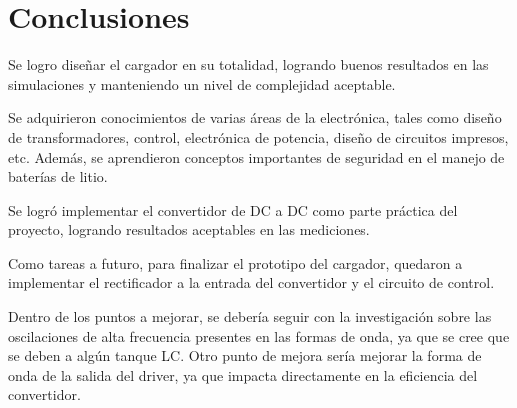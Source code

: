 \section{Conclusiones}








Se logro diseñar el cargador en su totalidad, logrando buenos resultados en las simulaciones y manteniendo un nivel de complejidad aceptable.

Se adquirieron conocimientos de varias áreas de la electrónica, tales como diseño de transformadores, control, electrónica de potencia, diseño de circuitos impresos, etc.
Además, se aprendieron conceptos importantes de seguridad en el manejo de baterías de litio.

Se logró implementar el convertidor de DC a DC como parte práctica del proyecto, logrando resultados aceptables en las mediciones.

Como tareas a futuro, para finalizar el prototipo del cargador, quedaron a implementar el rectificador a la entrada del convertidor y el circuito de control.

Dentro de los puntos a mejorar, se debería seguir con la investigación sobre las oscilaciones de alta frecuencia presentes en las formas de onda, ya que se cree que se deben a algún tanque LC.
Otro punto de mejora sería mejorar la forma de onda de la salida del driver, ya que impacta directamente en la eficiencia del convertidor.
